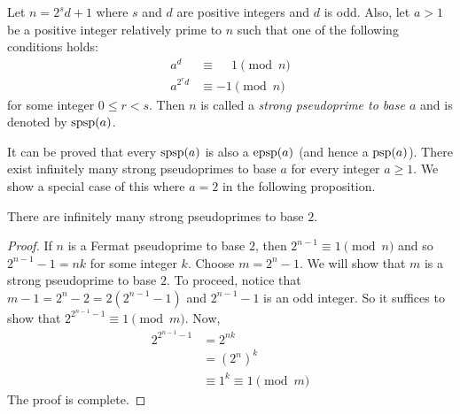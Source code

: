 \documentclass{subfile}
\begin{document}
	\begin{definition}
		Let $n=2^sd+1$ where $s$ and $d$ are positive integers and $d$ is odd. Also, let $a>1$ be a positive integer relatively prime to $n$ such that one of the following conditions holds:
			\begin{align*}
				a^d
					& \equiv \phantom{-} 1 \pmod n\\
				a^{2^rd} &\equiv -1 \pmod n
			\end{align*}
		for some integer $0 \leq r <s$. Then $n$ is called a \textit{strong pseudoprime to base $a$} and is denoted by $\operatorname{spsp}(a)$.
	\end{definition}
It can be proved that every $\operatorname{spsp}(a)$ is also a $\operatorname{epsp}(a)$ (and hence a $\operatorname{psp}(a)$). There exist infinitely many strong pseudoprimes to base $a$ for every integer $a \geq 1$. We show a special case of this where $a=2$ in the following proposition.

	\begin{proposition}
		There are infinitely many strong pseudoprimes to base $2$.
	\end{proposition}

	\begin{proof}
		If $n$ is a Fermat pseudoprime to base $2$, then $2^{n-1} \equiv 1 \pmod n$ and so $2^{n-1}-1=nk$ for some integer $k$. Choose $m=2^{n}-1$. We will show that $m$ is a strong pseudoprime to base $2$. To proceed, notice that $m-1=2^n-2=2\left(2^{n-1}-1\right)$ and $2^{n-1}-1$ is an odd integer. So it suffices to show that $2^{2^{n-1}-1} \equiv 1 \pmod m$. Now,
			\begin{align*}
				2^{2^{n-1}-1}
					& = 2^{nk}\\
					& = \left(2^n\right)^k\\
					& \equiv 1^k \equiv 1 \pmod{m}
			\end{align*}
		The proof is complete.
	\end{proof}
\end{document}
